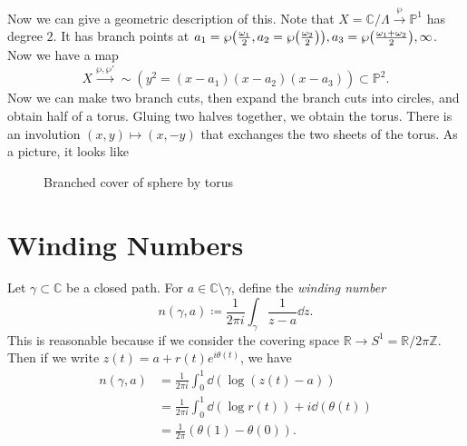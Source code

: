 \documentclass[leqno, openany]{memoir}
\theoremstyle{definition}
\theoremstyle{remark}
\theoremstyle{plain}
\theoremstyle{definition}
\theoremstyle{remark}
\newcommand{\R}{\mathbb{R}}
\newcommand{\C}{\mathbb{C}}
\newcommand{\Z}{\mathbb{Z}}
\renewcommand{\P}{\mathbb{P}}
\begin{document}
Now we can give a geometric description of this. Note that $X = \C/\Lambda \xrightarrow{\wp} \P^1$ has degree $2$. It has branch points at $a_1 = \wp\qty(\frac{\omega_1}{2}, a_2 = \wp\qty(\frac{\omega_2}{2})), a_3 = \wp\qty(\frac{\omega_1 + \omega_2}{2}), \infty$. Now we have a map
\[ X \xrightarrow{\wp, \wp'}{\sim} (y^2 = (x-a_1)(x-a_2)(x-a_3)) \subset \P^2. \]
Now we can make two branch cuts, then expand the branch cuts into circles, and obtain half of a torus. Gluing two halves together, we obtain the torus. There is an involution $(x,y) \mapsto (x,-y)$ that exchanges the two sheets of the torus. As a picture, it looks like
\begin{figure}[H]
\begin{center}
\end{center}
\caption{Branched cover of sphere by torus}%
\label{fig:}
\end{figure}

\section{Winding Numbers}%
\label{sec:winding_numbers}

Let $\gamma \subset \C$ be a closed path. For $a \in \C \setminus \gamma$, define the \textit{winding number}
\[ n(\gamma, a) \coloneqq \frac{1}{2 \pi i} \int_{\gamma} \frac{1}{z-a} \dd{z}. \]
This is reasonable because if we consider the covering space $\R \to S^1 = \R/2 \pi \Z$. Then if we write $z(t) = a + r(t) e^{i \theta(t)}$, we have
\begin{align*}
    n(\gamma, a) &= \frac{1}{2 \pi i} \int_0^1 \dd(\log(z(t) - a)) \\
                 &= \frac{1}{2 \pi i} \int_0^1 \dd(\log r(t)) + i \dd(\theta(t)) \\
                 &= \frac{1}{2 \pi} (\theta(1) - \theta(0)).
\end{align*}
\end{document}
